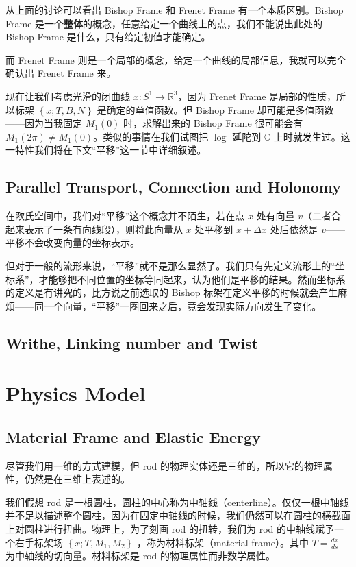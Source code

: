 \documentclass{notes}
\begin{document}
从上面的讨论可以看出 Bishop Frame 和 Frenet Frame 有一个本质区别。Bishop Frame 是一个\textbf{整体}的概念，任意给定一个曲线上的点，我们不能说出此处的 Bishop Frame 是什么，只有给定初值才能确定。

而 Frenet Frame 则是一个局部的概念，给定一个曲线的局部信息，我就可以完全确认出 Frenet Frame 来。

现在让我们考虑光滑的闭曲线 $x: S^1 \rightarrow \mathbb{R}^3$，因为 Frenet Frame 是局部的性质，所以标架 $\left\lbrace x; T, B, N \right\rbrace$ 是确定的单值函数。但 Bishop Frame 却可能是多值函数——因为当我固定 $M_1(0)$ 时，求解出来的 Bishop Frame 很可能会有 $M_1(2 \pi) \ne M_1(0)$。类似的事情在我们试图把 $\log$ 延陀到 $\mathbb{C}$ 上时就发生过。这一特性我们将在下文“平移”这一节中详细叙述。

\subsection{Parallel Transport, Connection and Holonomy}

在欧氏空间中，我们对“平移”这个概念并不陌生，若在点 $x$ 处有向量 $v$（二者合起来表示了一条有向线段），则将此向量从 $x$ 处平移到 $x + \Delta x$ 处后依然是 $v$——平移不会改变向量的坐标表示。

但对于一般的流形来说，“平移”就不是那么显然了。我们只有先定义流形上的“坐标系”，才能够把不同位置的坐标等同起来，认为他们是平移的结果。然而坐标系的定义是有讲究的，比方说之前选取的 Bishop 标架在定义平移的时候就会产生麻烦——同一个向量，“平移”一圈回来之后，竟会发现实际方向发生了变化。

\subsection{Writhe, Linking number and Twist}



\section{Physics Model}

\subsection{Material Frame and Elastic Energy}

尽管我们用一维的方式建模，但 rod 的物理实体还是三维的，所以它的物理属性，仍然是在三维上表述的。

我们假想 rod 是一根圆柱，圆柱的中心称为中轴线（centerline）。仅仅一根中轴线并不足以描述整个圆柱，因为在固定中轴线的时候，我们仍然可以在圆柱的横截面上对圆柱进行扭曲。物理上，为了刻画 rod 的扭转，我们为 rod 的中轴线赋予一个右手标架场 $\left\lbrace x; T, M_1, M_2 \right\rbrace$ ，称为材料标架（material frame）。其中 $T = \frac{dx}{ds}$ 为中轴线的切向量。材料标架是 rod 的物理属性而非数学属性。
\end{document}
